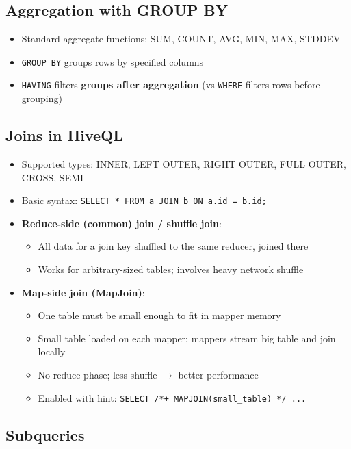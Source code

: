\documentclass[11pt, onecolumn, a4paper]{article}
\begin{document}
\subsection{Aggregation with GROUP BY}

\begin{itemize}
  \item Standard aggregate functions: SUM, COUNT, AVG, MIN, MAX, STDDEV
  \item \texttt{GROUP BY} groups rows by specified columns
  \item \texttt{HAVING} filters \textbf{groups after aggregation} (vs \texttt{WHERE} filters rows before grouping)
\end{itemize}

\subsection{Joins in HiveQL}

\begin{itemize}
  \item Supported types: INNER, LEFT OUTER, RIGHT OUTER, FULL OUTER, CROSS, SEMI
  \item Basic syntax: \texttt{SELECT * FROM a JOIN b ON a.id = b.id;}
  \item \textbf{Reduce-side (common) join / shuffle join}:
  \begin{itemize}
    \item All data for a join key shuffled to the same reducer, joined there
    \item Works for arbitrary-sized tables; involves heavy network shuffle
  \end{itemize}
  \item \textbf{Map-side join (MapJoin)}:
  \begin{itemize}
    \item One table must be small enough to fit in mapper memory
    \item Small table loaded on each mapper; mappers stream big table and join locally
    \item No reduce phase; less shuffle $\rightarrow$ better performance
    \item Enabled with hint: \texttt{SELECT /*+ MAPJOIN(small\_table) */ ...}
  \end{itemize}
\end{itemize}

\subsection{Subqueries}
\end{document}
